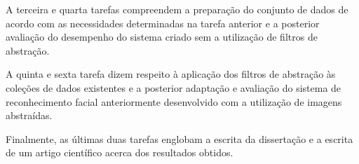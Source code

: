 A terceira e quarta tarefas compreendem a preparação do conjunto de dados de acordo com as necessidades determinadas na tarefa anterior e a posterior avaliação do desempenho do sistema criado sem a utilização de filtros de abstração.

A quinta e sexta tarefa dizem respeito à aplicação dos filtros de abstração às coleções de dados existentes e a posterior adaptação e avaliação do sistema de reconhecimento facial anteriormente desenvolvido com a utilização de imagens abstraídas.

Finalmente, as últimas duas tarefas englobam a escrita da dissertação e a escrita de um artigo científico acerca dos resultados obtidos.
